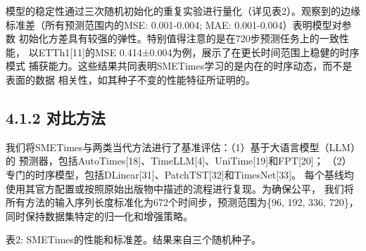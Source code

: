 \documentclass[
  10
]{article}
\begin{document}
模型的稳定性通过三次随机初始化的重复实验进行量化（详见表2）。观察到的边缘
标准差（所有预测范围内的MSE: 0.001-0.004; MAE: 0.001-0.004）表明模型对参数
初始化方差具有较强的弹性。特别值得注意的是在720步预测任务上的一致性能，
以ETTh1{[}11{]}的MSE 0.414±0.004为例，展示了在更长时间范围上稳健的时序模式
捕获能力。这些结果共同表明SMETimes学习的是内在的时序动态，而不是表面的数据
相关性，如其种子不变的性能特征所证明的。

\subsection{4.1.2 对比方法}\label{comparison-methods}

我们将SMETimes与两类当代方法进行了基准评估：（1）基于大语言模型（LLM）的
预测器，包括AutoTimes{[}18{]}、TimeLLM{[}4{]}、UniTime{[}19{]}和FPT{[}20{]}；
（2）专门的时序模型，包括DLinear{[}31{]}、PatchTST{[}32{]}和TimesNet{[}33{]}。
每个基线均使用其官方配置或按照原始出版物中描述的流程进行复现。为确保公平，
我们将所有方法的输入序列长度标准化为672个时间步，预测范围为\{96, 192, 336, 720\}，
同时保持数据集特定的归一化和增强策略。

表2: SMETimes的性能和标准差。结果来自三个随机种子。
\end{document}
